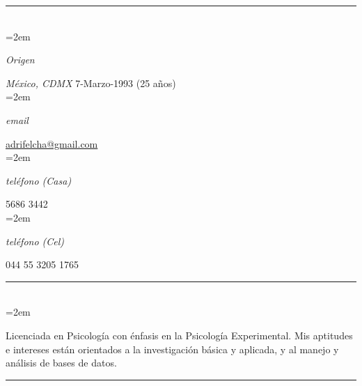 \documentclass{scrartcl}
\newlength{\datebox}\settowidth{\datebox}{September 2017} %
\newcommand{\NewEntry}[3]{\noindent\hangindent=2em\hangafter=0 \parbox{\datebox}{\small \textit{#1}}\hspace{1.5em} #2 #3 %
\vspace{0.5em}} %
\newcommand{\Description}[1]{\hangindent=2em\hangafter=0\noindent\raggedright\footnotesize{#1}\par\normalsize\vspace{1em}} %
\begin{document}
\thispagestyle{empty} %


\begin{cv}{\textbf{}}\vspace{1.5em} %

\hrule{}\vspace{1.5em}

\noindent{}\vspace{0.1em}\\ %

\NewEntry{Origen}{\textit{México, CDMX}}{7-Marzo-1993 (25 años)}\\ %
\NewEntry{email}{\href{mailto:adrifelcha@gmail.com}{adrifelcha@gmail.com}}\\ %
\NewEntry{teléfono (Casa)}{5686 3442}\\ %
\NewEntry{teléfono (Cel)}{044 55 3205 1765}\\%

\hrule{}\vspace{1.5em}

\noindent{}\vspace{0.1em}\\ %

\Description{Licenciada en Psicología con énfasis en la Psicología Experimental. Mis aptitudes e intereses están orientados a la investigación básica y aplicada, y al manejo y análisis de bases de datos.}\vspace{1em} %

\hrule{}\vspace{1.5em}



\end{cv}
\end{document}
